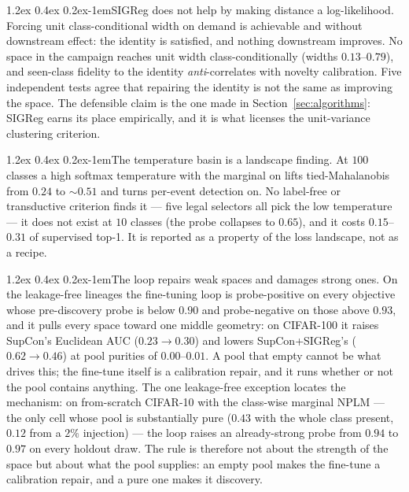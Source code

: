\documentclass{article}
\makeatletter
\renewcommand\paragraph{\@startsection{paragraph}{4}{\z@}%
  {1.2ex \@plus 0.4ex \@minus 0.2ex}{-1em}{\normalsize\bf}}
\makeatother
\begin{document}
\paragraph{SIGReg does not help by making distance a log-likelihood.}
Forcing unit class-conditional width on demand is achievable and without downstream effect:
the identity is satisfied, and nothing downstream improves. No space in the
campaign reaches unit width class-conditionally (widths $0.13$--$0.79$), and
seen-class fidelity to the identity \emph{anti}-correlates with novelty
calibration. Five independent tests agree that repairing the identity is not
the same as improving the space. The defensible claim is the one made in
Section~\ref{sec:algorithms}: SIGReg earns its place empirically, and it is
what licenses the unit-variance clustering criterion.

\paragraph{The temperature basin is a landscape finding.} At $100$ classes
a high softmax temperature with the marginal on lifts tied-Mahalanobis from
$0.24$ to $\sim$$0.51$ and turns per-event detection on. No label-free or
transductive criterion finds it --- five legal selectors all pick the low
temperature --- it does not exist at $10$ classes (the probe collapses to
$0.65$), and it costs $0.15$--$0.31$ of supervised top-1. It is reported as a
property of the loss landscape, not as a recipe.

\paragraph{The loop repairs weak spaces and damages strong ones.} On the
leakage-free lineages the fine-tuning loop is probe-positive on every
objective whose pre-discovery probe is below $0.90$ and probe-negative on those above
$0.93$, and it pulls every space toward one middle geometry: on CIFAR-100 it
raises SupCon's Euclidean AUC ($0.23 \to 0.30$) and lowers SupCon+SIGReg's
($0.62 \to 0.46$) at pool purities of $0.00$--$0.01$. A pool that empty
cannot be what drives this; the fine-tune itself is a calibration repair,
and it runs whether or not the pool contains anything. The one leakage-free
exception locates the mechanism: on from-scratch CIFAR-10 with the class-wise
marginal NPLM --- the only cell whose pool is substantially pure ($0.43$
with the whole class present, $0.12$ from a $2\%$ injection) --- the loop
raises an already-strong probe from $0.94$ to $0.97$ on every holdout draw.
The rule is therefore not about the strength of the space but about what the
pool supplies: an empty pool makes the fine-tune a calibration repair, and a
pure one makes it discovery.
\end{document}
